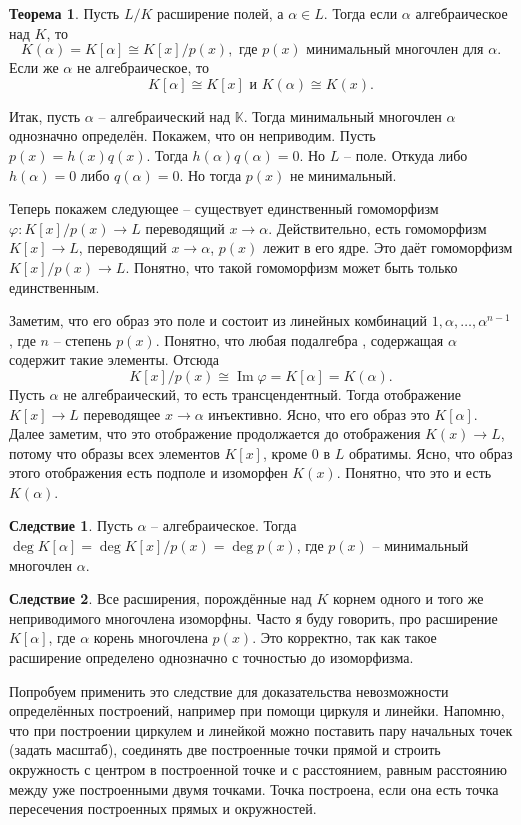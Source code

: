 \documentclass[10pt,a4paper,oneside]{book}
\theoremstyle{definition}
\newtheorem{thm}{{\color{red!40!black} Теорема}}
\newtheorem{cor}{Следствие}
\newcommand{\mb}[1]{\mathbb{#1}}
\newcommand{\im}{\operatorname{Im}}
\def\ffi{\varphi}
\def\thrm{\begin{thm}}
\def\ethrm{\end{thm}}
\def\crl{\begin{cor}}
\def\ecrl{\end{cor}}
\begin{document}
\thrm Пусть $L/K$ расширение полей, а $\alpha \in L$. Тогда если $\alpha$ алгебраическое над $K$, то $$K(\alpha)=K[\alpha]\cong K[x]/p(x),  \text{ где $p(x)$ минимальный многочлен для $\alpha$}.$$
Если же $\alpha$ не алгебраическое, то $$K[\alpha]\cong K[x] \text{ и } K(\alpha) \cong K(x).$$
\ethrm
\proof Итак, пусть $\alpha$ -- алгебраический над $\mb K$. Тогда минимальный многочлен $\alpha$ однозначно определён. Покажем, что он неприводим. Пусть $p(x)=h(x)q(x)$. Тогда $h(\alpha)q(\alpha)=0$. Но $L$ -- поле. Откуда либо $h(\alpha)=0$ либо $q(\alpha)=0$. Но тогда $p(x)$ не минимальный.

Теперь покажем следующее -- существует единственный гомоморфизм $\ffi \colon K[x]/p(x) \to L$ переводящий $x \to \alpha$. Действительно, есть гомоморфизм $K[x]\to L$, переводящий $x\to \alpha$, $p(x)$ лежит в его ядре. Это даёт гомоморфизм $K[x]/p(x) \to L$. 
Понятно, что такой гомоморфизм может быть только единственным.

Заметим, что его образ это поле и состоит из линейных комбинаций $1,\alpha,\dots,\alpha^{n-1}$, где $n$ -- степень $p(x)$. Понятно, что любая подалгебра , содержащая $\alpha$ содержит такие элементы. Отсюда $$K[x]/p(x) \cong \im \ffi = K[\alpha]=K(\alpha).$$
Пусть $\alpha$ не алгебраический, то есть трансцендентный. Тогда отображение $K[x] \to L$ переводящее $x\to\alpha$ инъективно. Ясно, что его образ это $K[\alpha]$. Далее заметим, что это отображение продолжается до отображения $K(x) \to L$, потому что образы всех элементов $K[x]$, кроме 0 в $L$ обратимы. Ясно, что образ этого отображения есть подполе и изоморфен $K(x)$. Понятно, что это и есть $K(\alpha)$.   
\endproof

\crl Пусть $\alpha$ -- алгебраическое. Тогда $\deg K[\alpha]= \deg K[x]/p(x)= \deg p(x)$, где $p(x)$ -- минимальный многочлен $\alpha$.
\ecrl

\crl Все расширения, порождённые над $K$ корнем одного и того же неприводимого многочлена изоморфны. Часто я буду говорить, про расширение $K[\alpha]$, где $\alpha$ корень многочлена $p(x)$. Это корректно, так как такое расширение определено однозначно с точностью до изоморфизма.
\ecrl

Попробуем применить это следствие для доказательства невозможности определённых  построений, например при помощи циркуля и линейки. Напомню, что при построении циркулем и линейкой можно поставить пару начальных точек (задать масштаб), соединять две построенные  точки прямой и строить окружность с центром в построенной точке и с расстоянием, равным расстоянию между уже построенными двумя точками. Точка построена, если она есть точка пересечения построенных прямых и окружностей. 
\end{document}
